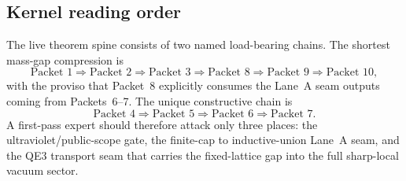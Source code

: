 \subsection{Kernel reading order}
The live theorem spine consists of two named load-bearing chains. The shortest mass-gap compression is
\[
  \text{Packet 1}\Rightarrow \text{Packet 2}\Rightarrow \text{Packet 3}\Rightarrow \text{Packet 8}\Rightarrow \text{Packet 9}\Rightarrow \text{Packet 10},
\]
with the proviso that Packet~8 explicitly consumes the Lane~A seam outputs coming from Packets~6--7. The unique constructive chain is
\[
  \text{Packet 4}\Rightarrow \text{Packet 5}\Rightarrow \text{Packet 6}\Rightarrow \text{Packet 7}.
\]
A first-pass expert should therefore attack only three places: the ultraviolet/public-scope gate, the finite-cap to inductive-union Lane~A seam, and the QE3 transport seam that carries the fixed-lattice gap into the full sharp-local vacuum sector.
